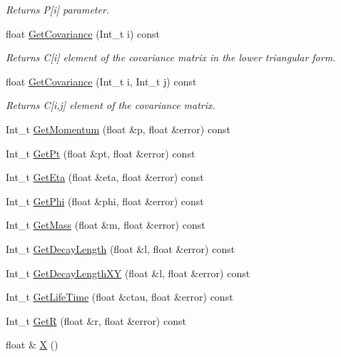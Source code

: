 \begin{DoxyCompactItemize}
\begin{DoxyCompactList}\small\item\em Returns P\mbox{[}i\mbox{]} parameter. \end{DoxyCompactList}\item 
float \hyperlink{classKFParticleBase_aa2d4b499ceab3e14819f3fbc98655950}{Get\+Covariance} (Int\+\_\+t i) const \hypertarget{classKFParticleBase_aa2d4b499ceab3e14819f3fbc98655950}{}\label{classKFParticleBase_aa2d4b499ceab3e14819f3fbc98655950}

\begin{DoxyCompactList}\small\item\em Returns C\mbox{[}i\mbox{]} element of the covariance matrix in the lower triangular form. \end{DoxyCompactList}\item 
float \hyperlink{classKFParticleBase_a4b95958ca961afb36581235d96808a01}{Get\+Covariance} (Int\+\_\+t i, Int\+\_\+t j) const \hypertarget{classKFParticleBase_a4b95958ca961afb36581235d96808a01}{}\label{classKFParticleBase_a4b95958ca961afb36581235d96808a01}

\begin{DoxyCompactList}\small\item\em Returns C\mbox{[}i,j\mbox{]} element of the covariance matrix. \end{DoxyCompactList}\item 
Int\+\_\+t \hyperlink{classKFParticleBase_a4b3409c5572d7e7735e8cf24f257e4b5}{Get\+Momentum} (float \&p, float \&error) const 
\item 
Int\+\_\+t \hyperlink{classKFParticleBase_a009ff3d3ca24073b2d5084a875202425}{Get\+Pt} (float \&pt, float \&error) const 
\item 
Int\+\_\+t \hyperlink{classKFParticleBase_a3bb4112f2132e8b01e5c1dc832c3fc39}{Get\+Eta} (float \&eta, float \&error) const 
\item 
Int\+\_\+t \hyperlink{classKFParticleBase_a2f6850dd386670f3bb4a53760022ee6f}{Get\+Phi} (float \&phi, float \&error) const 
\item 
Int\+\_\+t \hyperlink{classKFParticleBase_a31ec53f7baf5b341159d52ea2022013d}{Get\+Mass} (float \&m, float \&error) const 
\item 
Int\+\_\+t \hyperlink{classKFParticleBase_a81aaf861a28d4059cd2063649f387b8b}{Get\+Decay\+Length} (float \&l, float \&error) const 
\item 
Int\+\_\+t \hyperlink{classKFParticleBase_a15266ac3c4e995994e58061cafa12388}{Get\+Decay\+Length\+XY} (float \&l, float \&error) const 
\item 
Int\+\_\+t \hyperlink{classKFParticleBase_abc0c970f6089f124e826a1d359de73da}{Get\+Life\+Time} (float \&ctau, float \&error) const 
\item 
Int\+\_\+t \hyperlink{classKFParticleBase_a0f5d0aea519ac9d4c4051416d15b5231}{GetR} (float \&r, float \&error) const 
\item 
float \& \hyperlink{classKFParticleBase_a77a63f041716235c0d480d4cceebe6f1}{X} ()\hypertarget{classKFParticleBase_a77a63f041716235c0d480d4cceebe6f1}{}\label{classKFParticleBase_a77a63f041716235c0d480d4cceebe6f1}


\end{DoxyCompactItemize}
